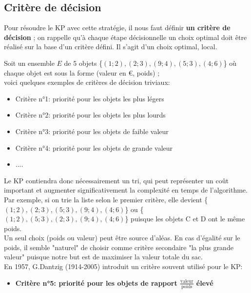 \documentclass[12pt,french]{article}
\begin{document}
\subsection{Critère de décision}

Pour résoudre le KP avec cette stratégie, il nous faut définir \textbf{un critère de décision} ; on rappelle qu'à chaque étape décisionnelle un choix optimal doit être réalisé sur la base d'un critère défini. Il s'agit d'un choix optimal, local.

\begin{tcolorbox}[enhanced,attach boxed title to top center={yshift=-3mm,yshifttext=-1mm},
	colback=green!5!white,colframe=green!75!black,colbacktitle=green!25!black,
	title=Exemple 4, fonttitle=\bfseries,
	boxed title style={size=small,colframe=blue!25!black} ]
	\small
	Soit un ensemble $E$  de 5 objets  \{$(1;2), (2;3), (9;4), (5;3), (4;6)$\} où chaque objet est sous la forme (valeur en €, poids) ;\\ voici quelques exemples de critères de décision triviaux:
	\begin{itemize}
		\item Critère n°1: priorité pour les objets les plus légers 
		\item Critère n°2: priorité pour les objets les plus lourds
		\item  Critère n°3: priorité pour les objets de faible valeur
		\item  Critère n°4: priorité pour les objets de grande valeur
		\item  ....
	\end{itemize}
	Le KP contiendra donc nécessairement un tri, qui peut  représenter un coût important et augmenter significativement la complexité en temps de l'algorithme.\\
    Par exemple, si on trie la liste selon le premier critère, elle devient \{$(1;2), (2;3), (5;3), (9;4), (4;6)$\} ou \{$(1;2),(5;3), (2;3), (9;4), (4;6)$\} puisque les objets C et D ont le même poids.\\	
	Un seul choix (poids ou valeur) peut être source d'aléas. En cas d'égalité sur le poids, il semble "naturel" de choisir comme critère secondaire "la plus grande valeur" puisque notre but est de maximiser la valeur totale du sac.\\
	\normalsize
	 En 1957, G.Dantzig (1914-2005) introduit un critère souvent utilisé pour le KP: 
	\begin{itemize}
		\item \textbf{Critère n°5: priorité pour les objets de rapport $ \frac{\text{valeur}}{\text{poids}} $ élevé}
		
	\end{itemize} 
\end{tcolorbox}
\vspace{2mm}
\end{document}
